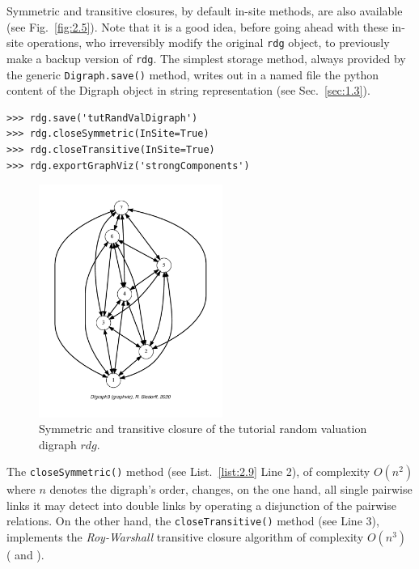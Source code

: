 Symmetric and transitive closures, by default in-site methods, are also available (see Fig.~\vref{fig:2.5}). Note that it is a good idea, before going ahead with these in-site operations, who irreversibly modify the original \texttt{rdg} object, to previously make a backup version of \texttt{rdg}. The simplest storage method, always provided by the generic \texttt{Digraph.save()} method, writes out in a named file the python content of the Digraph object in string representation (see Sec.~\vref{sec:1.3}).
\begin{lstlisting}[caption={Symmeric and transitive closures},label=list:2.9]
>>> rdg.save('tutRandValDigraph')
>>> rdg.closeSymmetric(InSite=True)
>>> rdg.closeTransitive(InSite=True)
>>> rdg.exportGraphViz('strongComponents')
\end{lstlisting}
\begin{figure}[h]
\sidecaption[t]
\includegraphics[width=6cm]{Figures/2-5-strongComponents.pdf}
\caption{Symmetric and transitive closure of the tutorial random valuation digraph $rdg$.}
\label{fig:2.5}       %
\end{figure}

The \texttt{closeSymmetric()} method (see List.~\vref{list:2.9} Line 2), of complexity $O(n^2)$ where $n$ denotes the digraph's order, changes, on the one hand, all single pairwise links it may detect into double links by operating a disjunction of the pairwise relations. On the other hand, the \texttt{closeTransitive()}  method (see Line 3), implements the \emph{Roy-Warshall} transitive closure algorithm of complexity $O(n^3)$   (\citet{ROY-1959} and \citet{WAR-1962}).


